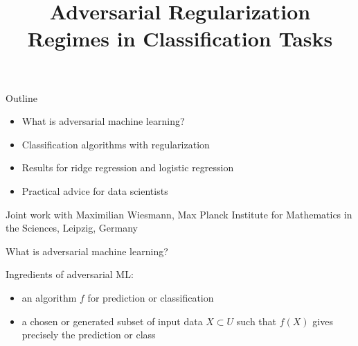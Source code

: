 
\usetikzlibrary{decorations}
\usetikzlibrary{snakes}

\title{Adversarial Regularization Regimes in Classification Tasks}

\maketitle

\begin{frame}{Outline}
  \begin{itemize}
      \item What is adversarial machine learning?
      \item Classification algorithms with regularization
      \item Results for ridge regression and logistic regression
      \item Practical advice for data scientists
  \end{itemize}

  \vspace{2cm}
  Joint work with Maximilian Wiesmann, Max Planck Institute for Mathematics in the Sciences, Leipzig, Germany

\end{frame}

\begin{frame}{What is adversarial machine learning?}

  Ingredients of adversarial ML:

  \begin{itemize}
    \item an algorithm $f$ for prediction or classification
    \item a chosen or generated subset of input data $X \subset U$ such that $f(X)$ gives precisely the prediction or class
  \end{itemize}

\end{frame}


